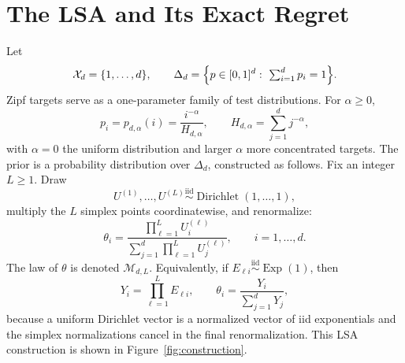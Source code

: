 \documentclass[11pt]{article}
\newcommand{\model}{\mathcal{M}_{d,L}}
\begin{document}
\section{The LSA and Its Exact Regret}
\label{sec:model}
Let
\[
  \mathcal X_d=\{1,\ldots,d\},
  \qquad
  \Delta_d=\Bigl\{p\in[0,1]^d:\ \textstyle\sum_{i=1}^d p_i=1\Bigr\}.
\]
Zipf targets serve as a one-parameter family of test distributions.  For
\(\alpha\ge 0\),
\[
  p_i=p_{d,\alpha}(i)
  =
  \frac{i^{-\alpha}}{H_{d,\alpha}},
  \qquad
  H_{d,\alpha}=\sum_{j=1}^d j^{-\alpha},
\]
with \(\alpha=0\) the uniform distribution and larger \(\alpha\) more
concentrated targets.
The prior is a probability distribution over \(\Delta_d\), constructed as
follows. Fix an integer \(L\ge 1\). Draw
\[
  U^{(1)},\ldots,U^{(L)}
  \stackrel{\mathrm{iid}}{\sim}
  \operatorname{Dirichlet}(1,\ldots,1),
\]
multiply the \(L\) simplex points coordinatewise, and renormalize:
\[
  \theta_i
  =
  \frac{\prod_{\ell=1}^L U^{(\ell)}_i}
       {\sum_{j=1}^d \prod_{\ell=1}^L U^{(\ell)}_j},
  \qquad i=1,\ldots,d.
\]
The law of \(\theta\) is denoted \(\model\).  Equivalently, if
\(E_{\ell i}\stackrel{\mathrm{iid}}{\sim}\operatorname{Exp}(1)\), then
\begin{equation}
\label{eq:exp-rep}
  Y_i=\prod_{\ell=1}^L E_{\ell i},
  \qquad
  \theta_i=\frac{Y_i}{\sum_{j=1}^d Y_j},
\end{equation}
because a uniform Dirichlet vector is a normalized vector of iid
exponentials and the simplex normalizations cancel in the final
renormalization.  This LSA construction is shown in Figure~\ref{fig:construction}.
\end{document}
